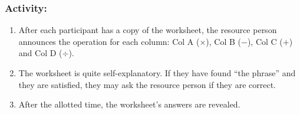 \subsubsection*{Activity:}
\begin{enumerate}
\item After each participant has a copy of the worksheet, the resource person announces the
operation for each column: Col A ($\times$), Col B ($-$), Col C ($+$) and Col D ($\div$).
\item The worksheet is quite self-explanatory. If they have found “the phrase” and they are
satisfied, they may ask the resource person if they are correct.
\item After the allotted time, the worksheet’s answers are revealed.
\end{enumerate}
\vfill 
\def\Cline{\cline{1-1} \cline{3-6} \cline{8-11} \cline{13-16} \cline{18-21}}
